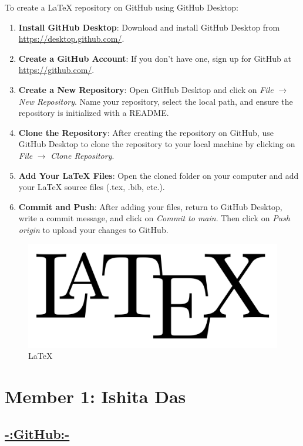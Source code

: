 \documentclass[a4paper,12pt]{article}
\begin{document}
\begin{center}
To create a \LaTeX{} repository on GitHub using GitHub Desktop:
\end{center}
\begin{enumerate}
    \item \textbf{Install GitHub Desktop}: Download and install GitHub Desktop from \url{https://desktop.github.com/}.
    \item \textbf{Create a GitHub Account}: If you don’t have one, sign up for GitHub at \url{https://github.com/}.
    \item \textbf{Create a New Repository}: Open GitHub Desktop and click on \textit{File} $\rightarrow$ \textit{New Repository}. Name your repository, select the local path, and ensure the repository is initialized with a README.
    \item \textbf{Clone the Repository}: After creating the repository on GitHub, use GitHub Desktop to clone the repository to your local machine by clicking on \textit{File} $\rightarrow$ \textit{Clone Repository}.
    \item \textbf{Add Your \LaTeX{} Files}: Open the cloned folder on your computer and add your \LaTeX{} source files (.tex, .bib, etc.). 
    \item \textbf{Commit and Push}: After adding your files, return to GitHub Desktop, write a commit message, and click on \textit{Commit to main}. Then click on \textit{Push origin} to upload your changes to GitHub.
\end{enumerate}
\begin{figure}[h!]
    \centering
    \includegraphics[width=0.5\linewidth]{LaTeX_logo.png}
    \caption{\LaTeX}
    
\end{figure}

\newpage

\section*{Member 1: Ishita Das}

\date{\today}
\FloatBarrier 
\begin{center}
\section*{\uline{-:GitHub:-}}
\end{center}
\end{document}

